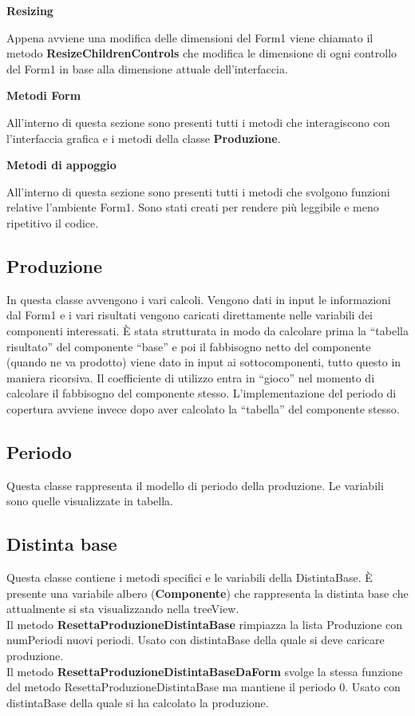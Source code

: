 \documentclass[12pt,twoside]{report}
\begin{document}
\bigskip
\textbf{Resizing}

Appena avviene una modifica delle dimensioni del Form1 viene chiamato il metodo \textbf{ResizeChildrenControls} che modifica le dimensione di ogni controllo del Form1 in base alla dimensione attuale dell’interfaccia.

\bigskip
\textbf{Metodi Form}

All’interno di questa sezione sono presenti tutti i metodi che interagiscono con l’interfaccia grafica e i metodi della classe \textbf{Produzione}. 

\bigskip
\textbf{Metodi di appoggio}

All’interno di questa sezione sono presenti tutti i metodi che svolgono funzioni relative l’ambiente Form1. Sono stati creati per rendere più leggibile e meno ripetitivo il codice.


\subsection{Produzione}

In questa classe avvengono i vari calcoli. Vengono dati in input le informazioni dal Form1 e i vari risultati vengono caricati direttamente nelle variabili dei componenti interessati. È stata strutturata in modo da calcolare prima la “tabella risultato” del componente “base” e poi il fabbisogno netto del componente (quando ne va prodotto) viene dato in input ai sottocomponenti, tutto questo in maniera ricorsiva.
Il coefficiente di utilizzo entra in “gioco” nel momento di calcolare il fabbisogno del componente stesso. 
L’implementazione del periodo di copertura avviene invece dopo aver calcolato la “tabella” del componente stesso.



\subsection{Periodo}
Questa classe rappresenta il modello di periodo della produzione. Le variabili sono quelle visualizzate in tabella.


\subsection{Distinta base}
Questa classe contiene i metodi specifici e le variabili della DistintaBase. È presente una variabile albero (\textbf{Componente}) che rappresenta la distinta base che attualmente si sta visualizzando nella treeView.\\
Il metodo \textbf{ResettaProduzioneDistintaBase} rimpiazza la lista Produzione con numPeriodi nuovi periodi. Usato con distintaBase della quale si deve caricare produzione.\\
Il metodo \textbf{ResettaProduzioneDistintaBaseDaForm} svolge la stessa funzione del metodo ResettaProduzioneDistintaBase ma mantiene il periodo 0. Usato con distintaBase della quale si ha calcolato la produzione.
\end{document}
